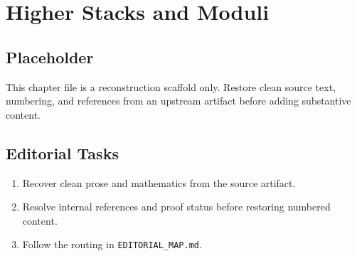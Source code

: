 \chapter{Higher Stacks and Moduli}
\label{chap:higher-stacks-and-moduli}

\section*{Placeholder}
This chapter file is a reconstruction scaffold only. Restore clean source text, numbering, and references from an upstream artifact before adding substantive content.

\section*{Editorial Tasks}
\begin{enumerate}
\item Recover clean prose and mathematics from the source artifact.
\item Resolve internal references and proof status before restoring numbered content.
\item Follow the routing in \texttt{EDITORIAL\_MAP.md}.
\end{enumerate}

